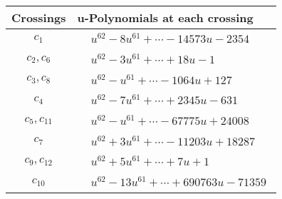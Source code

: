 \documentclass[1p]{elsarticle_modified}
\theoremstyle{definition}
\begin{document}
\begin{tabular}{m{50pt}|m{274pt}}
Crossings & \hspace{64pt}u-Polynomials at each crossing \\
\hline $$\begin{aligned}c_{1}\end{aligned}$$&$\begin{aligned}
&u^{62}-8 u^{61}+\cdots-14573 u-2354
\end{aligned}$\\
\hline $$\begin{aligned}c_{2},c_{6}\end{aligned}$$&$\begin{aligned}
&u^{62}-3 u^{61}+\cdots+18 u-1
\end{aligned}$\\
\hline $$\begin{aligned}c_{3},c_{8}\end{aligned}$$&$\begin{aligned}
&u^{62}- u^{61}+\cdots-1064 u+127
\end{aligned}$\\
\hline $$\begin{aligned}c_{4}\end{aligned}$$&$\begin{aligned}
&u^{62}-7 u^{61}+\cdots+2345 u-631
\end{aligned}$\\
\hline $$\begin{aligned}c_{5},c_{11}\end{aligned}$$&$\begin{aligned}
&u^{62}- u^{61}+\cdots-67775 u+24008
\end{aligned}$\\
\hline $$\begin{aligned}c_{7}\end{aligned}$$&$\begin{aligned}
&u^{62}+3 u^{61}+\cdots-11203 u+18287
\end{aligned}$\\
\hline $$\begin{aligned}c_{9},c_{12}\end{aligned}$$&$\begin{aligned}
&u^{62}+5 u^{61}+\cdots+7 u+1
\end{aligned}$\\
\hline $$\begin{aligned}c_{10}\end{aligned}$$&$\begin{aligned}
&u^{62}-13 u^{61}+\cdots+690763 u-71359
\end{aligned}$\\
\hline
\end{tabular}\\~\\
\end{document}
